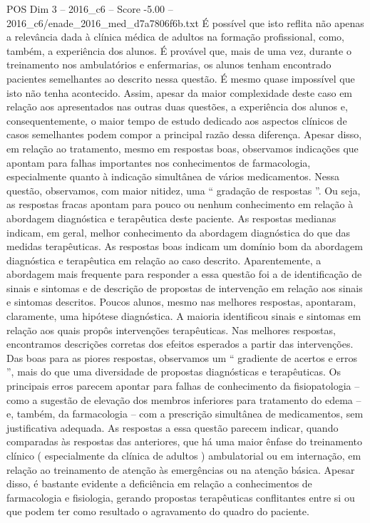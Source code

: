 \begin{textsample}{POS Dim 3 – 2016\_c6 – Score -5.00 – 2016\_c6/enade\_2016\_med\_d7a7806f6b.txt}
É possível que isto reflita não apenas a relevância dada à clínica médica de adultos na formação profissional, como, também, a experiência dos alunos.
É provável que, mais de uma vez, durante o treinamento nos ambulatórios e enfermarias, os alunos tenham encontrado pacientes semelhantes ao descrito nessa questão.
É mesmo quase impossível que isto não tenha acontecido.
Assim, apesar da maior complexidade deste caso em relação aos apresentados nas outras duas questões, a experiência dos alunos e, consequentemente, o maior tempo de estudo dedicado aos aspectos clínicos de casos semelhantes podem compor a principal razão dessa diferença.
Apesar disso, em relação ao tratamento, mesmo em respostas boas, observamos indicações que apontam para falhas importantes nos conhecimentos de farmacologia, especialmente quanto à indicação simultânea de vários medicamentos.
Nessa questão, observamos, com maior nitidez, uma “ gradação de respostas ”.
Ou seja, as respostas fracas apontam para pouco ou nenhum conhecimento em relação à abordagem diagnóstica e terapêutica deste paciente.
As respostas medianas indicam, em geral, melhor conhecimento da abordagem diagnóstica do que das medidas terapêuticas.
As respostas boas indicam um domínio bom da abordagem diagnóstica e terapêutica em relação ao caso descrito.
Aparentemente, a abordagem mais frequente para responder a essa questão foi a de identificação de sinais e sintomas e de descrição de propostas de intervenção em relação aos sinais e sintomas descritos.
Poucos alunos, mesmo nas melhores respostas, apontaram, claramente, uma hipótese diagnóstica.
A maioria identificou sinais e sintomas em relação aos quais propôs intervenções terapêuticas.
Nas melhores respostas, encontramos descrições corretas dos efeitos esperados a partir das intervenções.
Das boas para as piores respostas, observamos um “ gradiente de acertos e erros ”, mais do que uma diversidade de propostas diagnósticas e terapêuticas.
Os principais erros parecem apontar para falhas de conhecimento da fisiopatologia – como a sugestão de elevação dos membros inferiores para tratamento do edema – e, também, da farmacologia – com a prescrição simultânea de medicamentos, sem justificativa adequada.
As respostas a essa questão parecem indicar, quando comparadas às respostas das anteriores, que há uma maior ênfase do treinamento clínico ( especialmente da clínica de adultos ) ambulatorial ou em internação, em relação ao treinamento de atenção às emergências ou na atenção básica.
Apesar disso, é bastante evidente a deficiência em relação a conhecimentos de farmacologia e fisiologia, gerando propostas terapêuticas conflitantes entre si ou que podem ter como resultado o agravamento do quadro do paciente.

\end{textsample}
